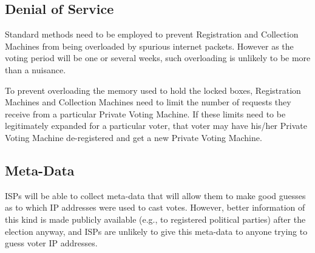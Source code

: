 \documentclass[12pt]{article}
\begin{document}
\subsection{Denial of Service}

Standard methods need to be employed to prevent Registration and
Collection Machines from being overloaded by spurious internet packets.
However as the voting period will be one or several weeks, such
overloading is unlikely to be more than a nuisance.

To prevent overloading the memory used to hold the locked boxes,
Registration Machines and Collection Machines need to limit the
number of requests they receive from a particular Private Voting Machine.
If these limits need to be legitimately expanded for a particular
voter, that voter may have his/her Private Voting Machine de-registered
and get a new Private Voting Machine.

\subsection{Meta-Data}

ISPs will be able to collect meta-data that will allow them to
make good guesses as to which IP addresses were used to cast votes.
However, better information of this kind is made publicly available
(e.g., to registered political parties) after the election anyway,
and ISPs are unlikely to give this meta-data to anyone trying to
guess voter IP addresses.
\end{document}
